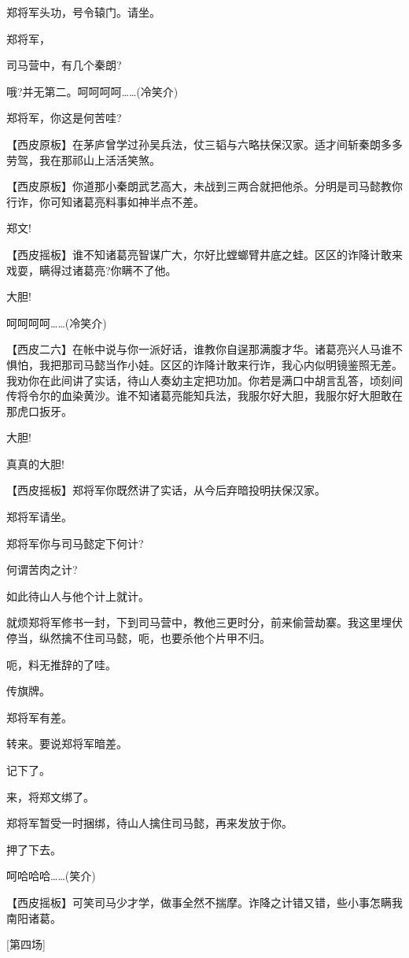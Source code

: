 郑将军头功，号令辕门。请坐。

郑将军，

司马营中，有几个秦朗?

哦?并无第二。呵呵呵呵\ldots{}\ldots{}(冷笑介)

郑将军，你这是何苦哇?

【西皮原板】在茅庐曾学过孙吴兵法，仗三韬与六略扶保汉家。适才间斩秦朗多多劳驾，我在那祁山上活活笑煞。

【西皮原板】你道那小秦朗武艺高大，未战到三两合就把他杀。分明是司马懿教你行诈，你可知诸葛亮料事如神半点不差。

郑文!

【西皮摇板】谁不知诸葛亮智谋广大，尔好比螳螂臂井底之蛙。区区的诈降计敢来戏耍，瞒得过诸葛亮?你瞒不了他。

大胆!

呵呵呵呵\ldots{}\ldots{}(冷笑介)

【西皮二六】在帐中说与你一派好话，谁教你自逞那满腹才华。诸葛亮兴人马谁不惧怕，我把那司马懿当作小娃。区区的诈降计敢来行诈，我心内似明镜鉴照无差。我劝你在此间讲了实话，待山人奏幼主定把功加。你若是满口中胡言乱答，顷刻间传将令尔的血染黄沙。谁不知诸葛亮能知兵法，我服尔好大胆，我服尔好大胆敢在那虎口扳牙。

大胆!

真真的大胆!

【西皮摇板】郑将军你既然讲了实话，从今后弃暗投明扶保汉家。

郑将军请坐。

郑将军你与司马懿定下何计?

何谓苦肉之计?

如此待山人与他个计上就计。

就烦郑将军修书一封，下到司马营中，教他三更时分，前来偷营劫寨。我这里埋伏停当，纵然擒不住司马懿，呃，也要杀他个片甲不归。

呃，料无推辞的了哇。

传旗牌。

郑将军有差。

转来。要说郑将军暗差。

记下了。

来，将郑文绑了。

郑将军暂受一时捆绑，待山人擒住司马懿，再来发放于你。

押了下去。

呵哈哈哈\ldots{}\ldots{}(笑介)

【西皮摇板】可笑司马少才学，做事全然不揣摩。诈降之计错又错，些小事怎瞒我南阳诸葛。

{[}第四场{]}

